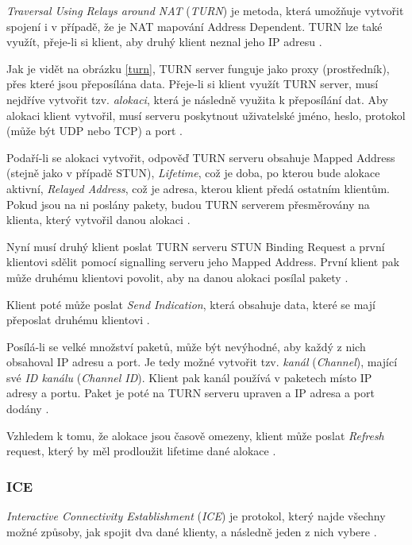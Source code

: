 \textit{Traversal Using Relays around NAT} (\textit{TURN}) je metoda, která
umožňuje vytvořit spojení i v případě, že je NAT mapování Address Dependent.
TURN lze také využít, přeje-li si klient, aby druhý klient neznal jeho IP adresu
\cite{WebRTCForTheCurious}.

Jak je vidět na obrázku \ref{turn}, TURN server funguje jako proxy (prostředník),
přes které jsou přeposílána data. Přeje-li si klient využít TURN server, musí
nejdříve vytvořit tzv. \textit{alokaci}, která je následně využita k přeposílání
dat. Aby alokaci klient vytvořil, musí serveru poskytnout uživatelské jméno,
heslo, protokol (může být UDP nebo TCP) a port \cite{WebRTCForTheCurious}.

Podaří-li se alokaci vytvořit, odpověď TURN serveru obsahuje Mapped Address
(stejně jako v případě STUN), \textit{Lifetime}, což je doba, po kterou bude
alokace aktivní, \textit{Relayed Address}, což je adresa, kterou klient předá
ostatním klientům. Pokud jsou na ni poslány pakety, budou TURN serverem
přesměrovány na klienta, který vytvořil danou alokaci
\cite{WebRTCForTheCurious}.

Nyní musí druhý klient poslat TURN serveru STUN Binding Request a první
klientovi sdělit pomocí signalling serveru jeho Mapped Address. První klient pak
může druhému klientovi povolit, aby na danou alokaci posílal pakety
\cite{WebRTCForTheCurious}.

Klient poté může poslat \textit{Send Indication}, která obsahuje data, které se
mají přeposlat druhému klientovi \cite{WebRTCForTheCurious}.

Posílá-li se velké množství paketů, může být nevýhodné, aby každý z nich
obsahoval IP adresu a port. Je tedy možné vytvořit tzv. \textit{kanál}
(\textit{Channel}), mající své \textit{ID kanálu} (\textit{Channel ID}). Klient
pak kanál používá v paketech místo IP adresy a portu. Paket je poté na TURN
serveru upraven a IP adresa a port dodány \cite{WebRTCForTheCurious}.

Vzhledem k tomu, že alokace jsou časově omezeny, klient může poslat
\textit{Refresh} request, který by měl prodloužit lifetime dané alokace
\cite{WebRTCForTheCurious}.

\subsubsection{ICE}\label{ice}

\textit{Interactive Connectivity Establishment} (\textit{ICE}) je protokol,
který najde všechny možné způsoby, jak spojit dva dané klienty, a následně jeden
z nich vybere \cite{WebRTCForTheCurious}.

